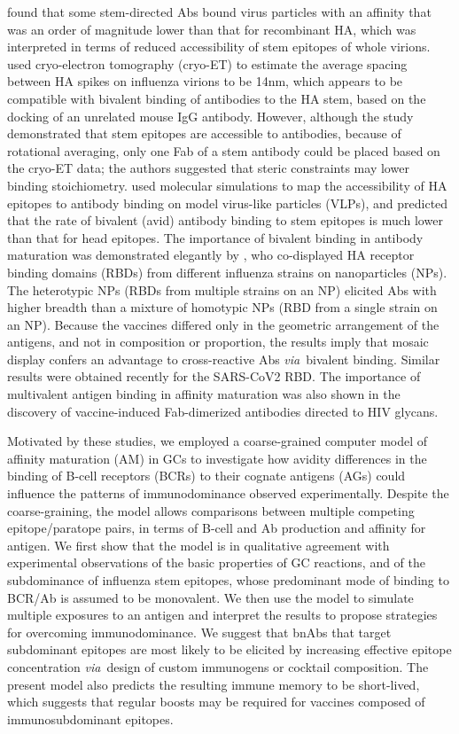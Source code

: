 \documentclass[utf8]{frontiersHLTH}%
\newcommand{\cred}[1]{#1} %
\def\via {{\it via}}
\begin{document}
\citet{andrews15} found that some stem-directed Abs bound
virus particles with an affinity that was an order of magnitude lower than that for
recombinant HA, which was interpreted in terms of reduced accessibility of
stem epitopes of whole virions.
%
\cred{\citet{harris13} used cryo-electron tomography (cryo-ET) to estimate the 
average spacing between HA spikes on influenza virions to be 14nm, which
appears to be compatible with bivalent binding of antibodies to the HA
stem, based on the docking of an unrelated mouse IgG antibody.\cite{harris13}
However, although the study demonstrated that stem epitopes are
accessible to antibodies, because of rotational averaging, only one Fab
of a stem antibody could be placed based on the cryo-ET data; the authors suggested 
that steric constraints may lower binding stoichiometry.}
%
\citet{amitai20} used molecular simulations to map the accessibility
of HA epitopes to antibody binding on model virus-like particles (VLPs),
and predicted that the rate of bivalent (avid) antibody binding to stem
epitopes is much lower than that for head epitopes.
The importance of bivalent binding in antibody maturation was
demonstrated elegantly by \citet{kanekiyo19}, who co-displayed HA
receptor binding domains (RBDs) from different influenza strains on
nanoparticles (NPs). The heterotypic NPs (RBDs from multiple strains on an NP)
elicited Abs with higher breadth than a mixture of homotypic NPs (RBD from a single
strain on an NP). Because the vaccines differed only in the geometric
arrangement of the antigens, and not in composition or proportion, the results imply
that mosaic display confers an advantage to cross-reactive Abs
\via~bivalent binding\cite{kanekiyo19}. Similar results were obtained recently for the
SARS-CoV2 RBD.\cite{cohen21}
%
\cred{The importance of multivalent antigen binding in affinity maturation was
also shown in the discovery of vaccine-induced Fab-dimerized antibodies
directed to HIV glycans.\cite{williams21}}

Motivated by these studies, we employed a coarse-grained computer model
of affinity maturation (AM) in GCs to investigate how avidity
differences in the binding of B-cell receptors (BCRs) to their cognate antigens
(AGs) could influence the patterns of immunodominance observed
experimentally. Despite the coarse-graining, the model allows
comparisons between multiple competing epitope/paratope pairs,
in terms of B-cell and Ab production and affinity for antigen. We first show
that the model is in qualitative agreement with experimental observations of
the basic properties of GC reactions,
and of the subdominance of influenza stem epitopes, whose predominant mode of binding to BCR/Ab
is assumed to be monovalent.
We then use the model to simulate multiple exposures to an antigen
and interpret the results to propose strategies for
overcoming immunodominance. We suggest that bnAbs that target subdominant
epitopes are most likely to be elicited by increasing effective epitope
concentration \via~design of custom immunogens or cocktail composition.
The present model also predicts the resulting immune memory to be
short-lived, which suggests that regular boosts may be required for vaccines
composed of immunosubdominant epitopes.
\end{document}
